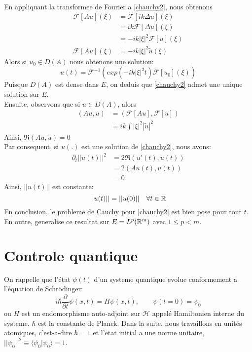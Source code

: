 En appliquant la transformee de Fourier a \eqref{chauchy2}, nous obtenons
\begin{align*} 
\mathcal{F}[Au](\xi) &= \mathcal{F}[ik\Delta u](\xi) \\ 
&= ik\mathcal{F}[\Delta u](\xi) \\
&= -ik|\xi|^2 \mathcal{F}[u](\xi) \\
\mathcal{F}[Au](\xi) &= -ik|\xi|^2 \tilde{u}(\xi)
\end{align*}
Alors si $u_0 \in D(A)$ nous obtenons une solution:
\begin{equation}
u(t)=\mathcal{F}^{-1}(exp(-ik|\xi|^2 t)\mathcal{F}[u_0](\xi))
\end{equation}
Puisque $D(A)$ est dense dans $E$, on deduis que \eqref{chauchy2} admet une unique solution sur $E$.\\
Ensuite, observons que si $u \in D(A)$, alors
\begin{align*}
(Au,u) &= (\mathcal{F}[Au],\mathcal{F}[u])\\
&= ik\int|\xi|^2 |\tilde{u}|^2
\end{align*}
Ainsi, $\Re (Au,u)=0$\\
Par consequent, si $u(.)$ est une solution de \eqref{chauchy2}, nous avons:
\begin{align*}
\partial_{t}||u(t)||^2 &= 2 \Re (u'(t),u(t))\\
&= 2 (Au(t),u(t))\\
&=0
\end{align*}
Ainsi, $||u(t)||$ est constante:
\begin{equation} \label{normecons}
||u(t)||=||u(0)|| \quad \forall t \in \mathbb R
\end{equation}
En conclusion, le probleme de Cauchy pour \eqref{chauchy2} est bien pose pour tout $t$.\\
En outre, \cite{Fattorini} generalise ce resultat sur $E=L^p (\mathbb R^m)$ avec $1 \leq p < m$.

\section{Controle quantique}
On rappelle que l'état $\psi(t)$ d'un systeme quantique evolue conformement a l'équation de Schrödinger:
\begin{equation}
i \hbar \dfrac{\partial }{\partial t} \psi (x,t) = H\psi (x,t),\quad \quad \psi(t=0)=\psi_0
\end{equation}
ou $H$ est un endomorphisme auto-adjoint sur $\mathcal{H}$ appelé Hamiltonien interne du systeme. $\hbar$ est la constante de Planck. Dans la suite, nous travaillons en unités atomiques, c'est-a-dire $\hbar=1$ et l'etat initial a une norme unitaire, $||\psi_0||^2 \equiv \langle \psi_0|\psi_0 \rangle =1$.
